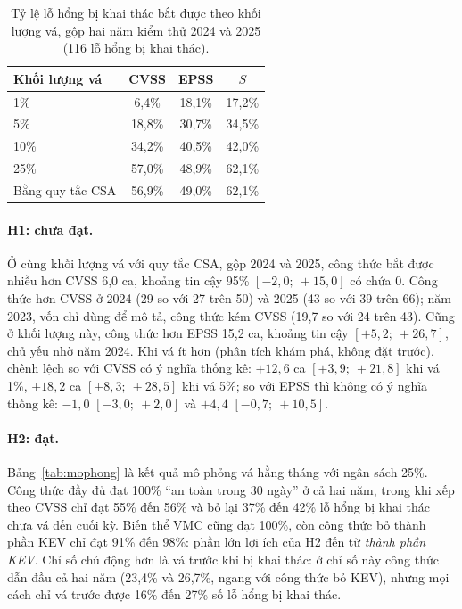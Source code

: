 \documentclass[runningheads]{llncs}
\begin{document}
\begin{table}
\centering
\caption{Tỷ lệ lỗ hổng bị khai thác bắt được theo khối lượng vá, gộp hai năm kiểm thử 2024 và
2025 (116 lỗ hổng bị khai thác).}\label{tab:a1}
\begin{tabular}{lccc}
\toprule
Khối lượng vá & CVSS & EPSS & $S$ \\
\midrule
1\%  & 6,4\%  & 18,1\% & 17,2\% \\
5\%  & 18,8\% & 30,7\% & 34,5\% \\
10\% & 34,2\% & 40,5\% & 42,0\% \\
25\% & 57,0\% & 48,9\% & 62,1\% \\
Bằng quy tắc CSA & 56,9\% & 49,0\% & 62,1\% \\
\bottomrule
\end{tabular}
\end{table}

\paragraph{H1: chưa đạt.} Ở cùng khối lượng vá với quy tắc CSA, gộp 2024 và 2025, công
thức bắt được nhiều hơn CVSS 6,0 ca, khoảng tin cậy 95\% $[-2{,}0;\ +15{,}0]$ có chứa 0. Công thức
hơn CVSS ở 2024 (29 so với 27 trên 50) và 2025 (43 so với 39 trên 66); năm 2023, vốn chỉ dùng
để mô tả, công thức kém CVSS (19,7 so với 24 trên 43). Cũng ở khối lượng này, công thức hơn EPSS
15,2 ca, khoảng tin cậy $[+5{,}2;\ +26{,}7]$, chủ yếu nhờ năm 2024. Khi vá ít hơn (phân tích khám
phá, không đặt trước), chênh lệch so với CVSS có ý nghĩa thống kê: $+12{,}6$ ca $[+3{,}9;\ +21{,}8]$ khi
vá 1\%, $+18{,}2$ ca $[+8{,}3;\ +28{,}5]$ khi vá 5\%; so với EPSS thì không có ý nghĩa thống kê: $-1{,}0$
$[-3{,}0;\ +2{,}0]$ và $+4{,}4$ $[-0{,}7;\ +10{,}5]$.

\paragraph{H2: đạt.} Bảng~\ref{tab:mophong} là kết quả mô phỏng vá hằng tháng với ngân
sách 25\%. Công thức đầy đủ đạt 100\% ``an toàn trong 30 ngày'' ở cả hai năm, trong khi xếp
theo CVSS chỉ đạt 55\% đến 56\% và bỏ lại 37\% đến 42\% lỗ hổng bị khai thác chưa vá đến cuối kỳ. Biến
thể VMC cũng đạt 100\%, còn công thức bỏ thành phần KEV chỉ đạt 91\% đến 98\%: phần lớn lợi ích của
H2 đến từ \emph{thành phần KEV}. Chỉ số chủ động hơn là vá trước khi bị khai thác: ở chỉ số này
công thức dẫn đầu cả hai năm (23,4\% và 26,7\%, ngang với công thức bỏ KEV), nhưng mọi cách chỉ vá trước được 16\% đến 27\% số
lỗ hổng bị khai thác.
\end{document}
